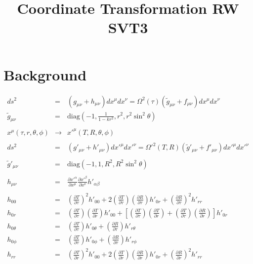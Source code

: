 \documentclass[10pt,letterpaper]{article}
\title{Coordinate Transformation RW SVT3}
\date{}
\numberwithin{equation}{section}
\begin{document}
 
\maketitle
\noindent 
\section{Background}
\begin{eqnarray}
ds^2 &=& (g_{\mu\nu} + h_{\mu\nu})dx^\mu dx^\nu = \Omega^2(\tau)(\tilde g_{\mu\nu} + f_{\mu\nu})dx^\mu dx^\nu
\\
\tilde g_{\mu\nu} &=& \text{diag}\left(-1,\frac{1}{1-kr^2},r^2,r^2\sin^2\theta\right)
\\ \nonumber\\ 
x^\mu (\tau,r,\theta,\phi) &\to& x'^\mu (T,R,\theta,\phi)
\\\nonumber\\
ds^2 &=& (g'_{\mu\nu} + h'_{\mu\nu})dx'^\mu dx'^\nu = \Omega'^2(T,R)(\tilde g'_{\mu\nu} + f'_{\mu\nu})dx'^\mu dx'^\nu
\\ \nonumber\\
\tilde g'_{\mu\nu} &=& \text{diag}\left(-1,1,R^2,R^2\sin^2\theta\right)
\\ \nonumber\\
h_{\mu\nu} &=& \frac{\partial x'^\alpha}{\partial x^\mu }\frac{\partial x'^\beta}{\partial x^\nu} h'_{\alpha\beta}
\\ \nonumber\\
h_{00} &=& \left( \frac{\partial T}{\partial \tau}\right)^2 h'_{00} + 2 \left(\frac{\partial T}{\partial \tau}\right)\left(\frac{\partial R}{\partial \tau}\right) h'_{0r} + \left(\frac{\partial R}{\partial \tau}\right)^2 h'_{rr}
\nonumber\\
h_{0r} &=& \left( \frac{\partial T}{\partial \tau}\right)\left( \frac{\partial T}{\partial r}\right)h'_{00} + \left[\left( \frac{\partial T}{\partial \tau}\right)\left( \frac{\partial T}{\partial r}\right)+\left( \frac{\partial T}{\partial \tau}\right)\left( \frac{\partial R}{\partial r}\right)\right]h'_{0r}
\nonumber\\
h_{0\theta} &=& \left( \frac{\partial T}{\partial \tau}\right)h'_{0\theta} + \left( \frac{\partial R}{\partial \tau}\right)h'_{r\theta}
\nonumber\\
h_{0\phi} &=& \left( \frac{\partial T}{\partial \tau}\right)h'_{0\phi} + \left( \frac{\partial R}{\partial \tau}\right)h'_{r\phi}
\nonumber\\
h_{rr} &=& \left( \frac{\partial T}{\partial r}\right)^2 h'_{00} + 2\left( \frac{\partial T}{\partial r}\right)\left( \frac{\partial R}{\partial r}\right)h'_{0r} + \left( \frac{\partial R}{\partial r}\right)^2 h'_{rr}

\end{eqnarray}
\end{document}
